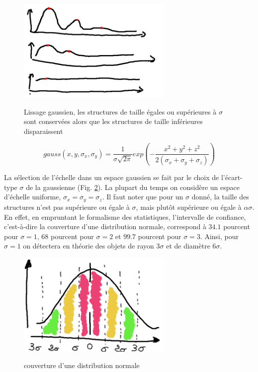   \begin{figure}[h]
    \centering
    \includegraphics[height=5cm]{Images/gaussian_smoothing.png}
    \label{fig:gaussian_smoothing}
    \caption{Lissage gaussien, les structures de taille égales ou supérieures à $\sigma$ sont conservées alors que les structures de taille inférieures disparaissent}
  \end{figure}
  
  \begin{equation}
    gauss(x,y,\sigma_{x},\sigma_{y}) = \frac{1}{ \sigma\sqrt{2\pi} }exp(-\frac{x^2 + y^2 + z^2}{2(\sigma_{x}+ \sigma_{y}+ \sigma_{z}) })
    \label{eq:Gaussienne 3D}
  \end{equation}
  
  La sélection de l'échelle dans un espace gaussien se fait par le choix de l'écart-type $\sigma$ de la gaussienne (Fig. \ref{fig:normal_distribution_probability_coverage}). La plupart du temps on considère un espace d'échelle uniforme, $\sigma_x = \sigma_y = \sigma_z$. Il faut noter que pour un $\sigma$ donné, la taille des structures n'est pas supérieure ou égale à $\sigma$, mais plutôt supérieure ou égale à $\alpha\sigma$. En effet, en empruntant le formalisme des statistiques, l'intervalle de confiance, c'est-à-dire la couverture d'une distribution normale, correspond à $34.1$ pourcent pour $\sigma=1$, $68$ pourcent pour $\sigma=2$ et $99.7$ pourcent pour $\sigma=3$. Ainsi, pour $\sigma=1$ on détectera en théorie des objets de rayon $3\sigma$ et de diamètre $6\sigma$.  
  
  \begin{figure}[h]
    \centering
    \includegraphics[height=5cm]{Images/normal_distribution_probability_coverage.png}
    \label{fig:normal_distribution_probability_coverage}
    \caption{couverture d'une distribution normale}
  \end{figure}
  
